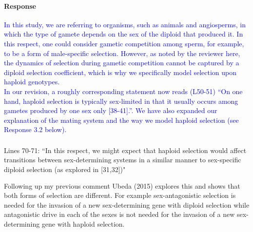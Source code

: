 \documentclass[10pt,letterpaper]{article}
\begin{document}
\noindent\paragraph{Response}
\textcolor{blue}{In this study, we are referring to organisms, such as animals and angiosperms, in which the type of gamete depends on the sex of the diploid that produced it. In this respect, one could consider gametic competition among sperm, for example, to be a form of male-specific selection. 
However, as noted by the reviewer here, the dynamics of selection during gametic competition cannot be captured by a diploid selection coefficient, which is why we specifically model selection upon haploid genotypes.
\\
\indent
In our revision, a roughly corresponding statement now reads (L50-51) ``On one hand, haploid selection is typically sex-limited in that it usually occurs among gametes produced by one sex only [38-41].''.
We have also expanded our explanation of the mating system and the way we model haploid selection (see Response 3.2 below).
}

\noindent\subsubsection{}
Lines 70-71: ``In this respect, we might expect that haploid selection would affect transitions between sex-determining systems in a similar manner to sex-specific diploid selection (as explored in [31,32])" 

Following up my previous comment Ubeda (2015) explores this and shows that both forms of selection are different. For example sex-antagonistic selection is needed for the invasion of a new sex-determining gene with diploid selection while antagonistic drive in each of the sexes is not needed for the invasion of a new sex-determining gene with haploid selection.
\end{document}

